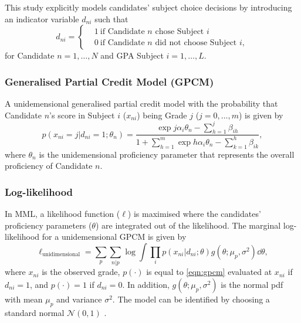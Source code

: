 This study explicitly models candidates' subject choice decisions by introducing an indicator variable $d_{ni}$ such that
\begin{equation}\label{eqn:indicator}
    d_{ni}=
    \left\{
        \begin{aligned}
            &1\ \text{if Candidate $n$ chose Subject $i$}\\
            &0\ \text{if Candidate $n$ did not choose Subject $i$},
        \end{aligned}
    \right.
\end{equation}
for Candidate $n = 1, \dots, N$ and GPA Subject $i = 1, \dots, L$.

\subsubsection{Generalised Partial Credit Model (GPCM)}

A unidemensional generalised partial credit model \parencite{muraki:1992} with the probability that Candidate $n$'s score in Subject $i$ ($x_{ni}$) being Grade $j$ ($j=0, \dots, m$) is given by
\begin{equation}\label{eqn:gpcm}
    p \left( x_{ni}=j | d_{ni} = 1; \theta_n \right) = \frac{\exp{j \alpha_i \theta_n - \sum_{h=1}^j \beta_{ih}} }{ 1 + \sum_{h=1}^m \exp{h \alpha_i \theta_n - \sum_{k=1}^h \beta_{ik}} },
\end{equation}
where $\theta_n$ is the unidemensional proficiency parameter that represents the overall proficiency of Candidate $n$.

\subsubsection{Log-likelihood}

In MML, a likelihood function ($\ell$) is maximised where the candidates' proficiency parameters ($\theta$) are integrated out of the likelihood. The marginal log-likelihood for a unidemensional GPCM is given by
\begin{equation}\label{eqn:ll}
    \ell_\text{unidimensional} = \sum_p \sum_{n | p} \log \int \prod_i p( x_{ni} | d_{ni}; \theta ) g(\theta; \mu_p, \sigma^2) \dd \theta,
\end{equation}
where $x_{ni}$ is the observed grade, $p( \cdot )$ is equal to \cref{eqn:gpcm} evaluated at $x_{ni}$ if $d_{ni}=1$, and $p( \cdot ) = 1$ if $d_{ni} = 0$. In addition, $g(\theta; \mu_p, \sigma^2)$ is the normal pdf with mean $\mu_p$ and variance $\sigma^2$. The model can be identified by choosing a standard normal $\mathcal{N}(0,1)$ \parencite{korobko:2008}.

